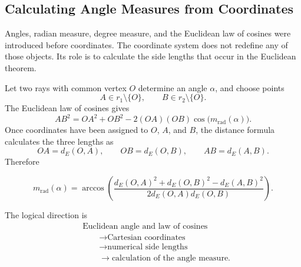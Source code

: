 \subsection{Calculating Angle Measures from Coordinates}

Angles, radian measure, degree measure, and the Euclidean law of cosines were
introduced before coordinates. The coordinate system does not redefine any of
those objects. Its role is to calculate the side lengths that occur in the
Euclidean theorem.

Let two rays with common vertex $O$ determine an angle $\alpha$, and choose
points
\[
A\in r_1\setminus\{O\},
\qquad
B\in r_2\setminus\{O\}.
\]
The Euclidean law of cosines gives
\[
AB^2
=
OA^2+OB^2-2(OA)(OB)\cos\bigl(m_{\mathrm{rad}}(\alpha)\bigr).
\]
Once coordinates have been assigned to $O$, $A$, and $B$, the distance formula
calculates the three lengths as
\[
OA=d_E(O,A),
\qquad
OB=d_E(O,B),
\qquad
AB=d_E(A,B).
\]
Therefore
\begin{theorembox}
\[
\boxed{
m_{\mathrm{rad}}(\alpha)
=
\arccos\left(
\frac{
d_E(O,A)^2+d_E(O,B)^2-d_E(A,B)^2
}{
2d_E(O,A)d_E(O,B)
}
\right)
}.
\]
\end{theorembox}

\begin{center}
\end{center}

The logical direction is
\[
\begin{aligned}
&\text{Euclidean angle and law of cosines}\\
&\qquad\longrightarrow\text{Cartesian coordinates}\\
&\qquad\longrightarrow\text{numerical side lengths}\\
&\qquad\longrightarrow\text{calculation of the angle measure}.
\end{aligned}
\]

